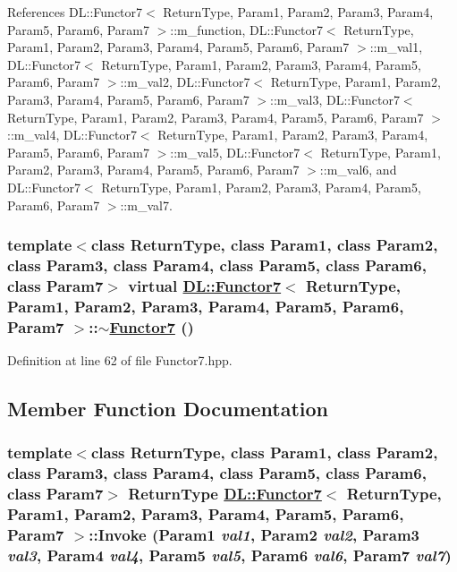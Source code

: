 References DL::Functor7$<$ Return\-Type, Param1, Param2, Param3, Param4, Param5, Param6, Param7 $>$::m\_\-function, DL::Functor7$<$ Return\-Type, Param1, Param2, Param3, Param4, Param5, Param6, Param7 $>$::m\_\-val1, DL::Functor7$<$ Return\-Type, Param1, Param2, Param3, Param4, Param5, Param6, Param7 $>$::m\_\-val2, DL::Functor7$<$ Return\-Type, Param1, Param2, Param3, Param4, Param5, Param6, Param7 $>$::m\_\-val3, DL::Functor7$<$ Return\-Type, Param1, Param2, Param3, Param4, Param5, Param6, Param7 $>$::m\_\-val4, DL::Functor7$<$ Return\-Type, Param1, Param2, Param3, Param4, Param5, Param6, Param7 $>$::m\_\-val5, DL::Functor7$<$ Return\-Type, Param1, Param2, Param3, Param4, Param5, Param6, Param7 $>$::m\_\-val6, and DL::Functor7$<$ Return\-Type, Param1, Param2, Param3, Param4, Param5, Param6, Param7 $>$::m\_\-val7.\hypertarget{classDL_1_1Functor7_a1}{
\subsubsection[$\sim$Functor7]{\setlength{\rightskip}{0pt plus 5cm}template$<$class Return\-Type, class Param1, class Param2, class Param3, class Param4, class Param5, class Param6, class Param7$>$ virtual \hyperlink{classDL_1_1Functor7}{DL::Functor7}$<$ Return\-Type, Param1, Param2, Param3, Param4, Param5, Param6, Param7 $>$::$\sim$\hyperlink{classDL_1_1Functor7}{Functor7} ()}}
\label{classDL_1_1Functor7_a1}




Definition at line 62 of file Functor7.hpp.

\subsection{Member Function Documentation}
\hypertarget{classDL_1_1Functor7_a3}{
\subsubsection[Invoke]{\setlength{\rightskip}{0pt plus 5cm}template$<$class Return\-Type, class Param1, class Param2, class Param3, class Param4, class Param5, class Param6, class Param7$>$ Return\-Type \hyperlink{classDL_1_1Functor7}{DL::Functor7}$<$ Return\-Type, Param1, Param2, Param3, Param4, Param5, Param6, Param7 $>$::Invoke (Param1 {\em val1}, Param2 {\em val2}, Param3 {\em val3}, Param4 {\em val4}, Param5 {\em val5}, Param6 {\em val6}, Param7 {\em val7})}}
\label{classDL_1_1Functor7_a3}




